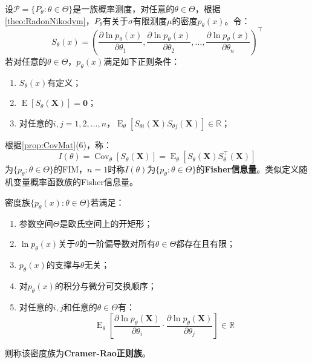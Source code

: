 \begin{definition}
	设$\mathscr{P}=\{P_{\theta}:\theta\in\Theta\}$是一族概率测度，对任意的$\theta\in\Theta$，根据\cref{theo:RadonNikodym}，$P_{\theta}$有关于$\sigma$有限测度$\mu$的密度$p_{\theta}(x)$。令：
	\begin{equation*}
		S_{\theta}(x)=\left(\frac{\partial\ln p_{\theta}(x)}{\partial\theta_1},\frac{\partial\ln p_{\theta}(x)}{\partial\theta_2},\dots,\frac{\partial\ln p_{\theta}(x)}{\partial\theta_n}\right)^{\top}
	\end{equation*}
	若对任意的$\theta\in\Theta$，$p_{\theta}(x)$满足如下正则条件：
	\begin{enumerate}
		\item $S_{\theta}(x)$有定义；
		\item $\operatorname{E}[S_{\theta}(\mathbf{X})]=\mathbf{0}$；
		\item 对任意的$i,j=1,2,\dots,n$，$\operatorname{E}_{\theta}[S_{\theta i}( \mathbf{X})S_{\theta j}( \mathbf{X})]\in\mathbb{R}$；
	\end{enumerate}
	根据\cref{prop:CovMat}(6)，称：
	\begin{equation*}
		I(\theta)=\operatorname{Cov}_{\theta}[S_{\theta}( \mathbf{X})]=\operatorname{E}_{\theta}[S_{\theta}( \mathbf{X})S_{\theta}^{\top}( \mathbf{X})]
	\end{equation*}
	为$\{p_{\theta}:\theta\in\Theta\}$的\gls{FIM}，$n=1$时称$I(\theta)$为$\{p_{\theta}:\theta\in\Theta\}$的\textbf{Fisher信息量}。类似定义随机变量概率函数族的Fisher信息量。
\end{definition}
\begin{definition}
	密度族$\{p_{\theta}(x):\theta\in\Theta\}$若满足：
	\begin{enumerate}
		\item 参数空间$\Theta$是欧氏空间上的开矩形；
		\item $\ln p_{\theta}(x)$关于$\theta$的一阶偏导数对所有$\theta\in\Theta$都存在且有限；
		\item $p_{\theta}(x)$的支撑与$\theta$无关；
		\item 对$p_{\theta}(x)$的积分与微分可交换顺序；
		\item 对任意的$i,j$和任意的$\theta\in\Theta$有：
		\begin{equation*}
			\operatorname{E}_{\theta}\left[\frac{\partial\ln p_{\theta}( \mathbf{X})}{\partial\theta_i}\cdot\frac{\partial\ln p_{\theta}( \mathbf{X})}{\partial\theta_j}\right]\in\mathbb{R}
		\end{equation*}
	\end{enumerate}
	则称该密度族为\textbf{Cramer-Rao正则族}。
\end{definition}
